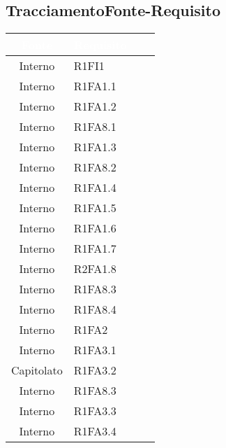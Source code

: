 \subsection{TracciamentoFonte-Requisito}
{
\renewcommand{\arraystretch}{1.5}
\centering
\begin{longtable}{ c C{4cm} c c}
\textcolor{white}{\textbf{Fonte}} & \textcolor{white}{\textbf{Requisito}}\\	
\endhead


Interno & R1FI1\\

Interno & R1FA1.1\\

Interno & R1FA1.2\\

Interno & R1FA8.1\\

Interno & R1FA1.3\\

Interno & R1FA8.2\\

Interno & R1FA1.4\\

Interno & R1FA1.5\\

Interno & R1FA1.6\\

Interno & R1FA1.7\\


Interno & R2FA1.8\\

Interno & R1FA8.3\\

Interno & R1FA8.4\\

Interno & R1FA2\\

Interno & R1FA3.1\\

Capitolato & R1FA3.2\\

Interno & R1FA8.3\\

Interno & R1FA3.3\\

Interno & R1FA3.4\\



\end{longtable}}
